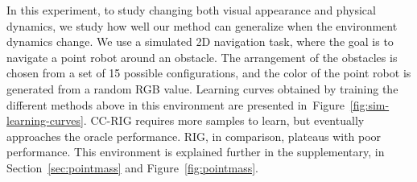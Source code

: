 \documentclass{article}
\begin{document}
In this experiment, to study changing both visual appearance and physical dynamics, we study how well our method can generalize when the environment dynamics change. We use a simulated 2D navigation task, where the goal is to navigate a point robot around an obstacle. The arrangement of the obstacles is chosen from a set of 15 possible configurations, and the color of the point robot is generated from a random RGB value. Learning curves obtained by training the different methods above in this environment are presented in~Figure~\ref{fig:sim-learning-curves}.
CC-RIG requires more samples to learn, but eventually approaches the oracle performance. RIG, in comparison, plateaus with poor performance. This environment is explained further in the supplementary, in Section~\ref{sec:pointmass} and Figure~\ref{fig:pointmass}.
\end{document}
